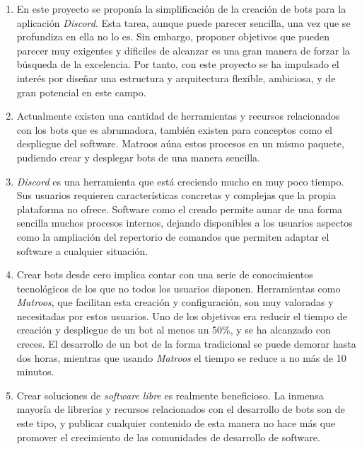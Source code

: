 \begin{enumerate}
	\item En este proyecto se proponía la simplificación de la creación de bots para la aplicación \textit{Discord}. Esta tarea, aunque puede parecer sencilla, una vez que se profundiza en ella no lo es. Sin embargo, proponer objetivos que pueden parecer muy exigentes y dificiles de alcanzar es una gran manera de forzar la búsqueda de la excelencia. Por tanto, con este proyecto se ha impulsado el interés por diseñar una estructura y arquitectura flexible, ambiciosa, y de gran potencial en este campo.
	
	\item Actualmente existen una cantidad de herramientas y recursos relacionados con los bots que es abrumadora, también existen para conceptos como el despliegue del software. Matroos aúna estos procesos en un mismo paquete, pudiendo crear y desplegar bots de una manera sencilla.

	\item \textit{Discord} es una herramienta que está creciendo mucho en muy poco tiempo. Sus usuarios requieren características concretas y complejas que la propia plataforma no ofrece. Software como el creado permite aunar de una forma sencilla muchos procesos internos, dejando disponibles a los usuarios aspectos como la ampliación del repertorio de comandos que permiten adaptar el software a cualquier situación.

	\item Crear bots desde cero implica contar con una serie de conocimientos tecnológicos de los que no todos los usuarios disponen. Herramientas como \textit{Matroos}, que facilitan esta creación y configuración, son muy valoradas y necesitadas por estos usuarios. Uno de los objetivos era reducir el tiempo de creación y despliegue de un bot al menos  un 50\%, y se ha alcanzado con creces. El desarrollo de un bot de la forma tradicional se puede demorar hasta dos horas, mientras que usando \textit{Matroos} el tiempo se reduce a no más de 10 minutos.

	\item Crear soluciones de \textit{software libre} es realmente beneficioso. La inmensa mayoría de librerías y recursos relacionados con el desarrollo de bots son de este tipo, y publicar cualquier contenido de esta manera no hace más que promover el crecimiento de las comunidades de desarrollo de software.
\end{enumerate}





